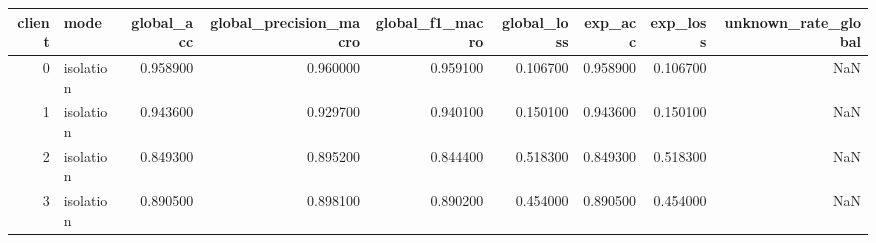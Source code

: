 \begin{tabular}{rlrrrrrrr}
\toprule
client & mode & global_acc & global_precision_macro & global_f1_macro & global_loss & exp_acc & exp_loss & unknown_rate_global \\
\midrule
0 & isolation & 0.958900 & 0.960000 & 0.959100 & 0.106700 & 0.958900 & 0.106700 & NaN \\
1 & isolation & 0.943600 & 0.929700 & 0.940100 & 0.150100 & 0.943600 & 0.150100 & NaN \\
2 & isolation & 0.849300 & 0.895200 & 0.844400 & 0.518300 & 0.849300 & 0.518300 & NaN \\
3 & isolation & 0.890500 & 0.898100 & 0.890200 & 0.454000 & 0.890500 & 0.454000 & NaN \\
\bottomrule
\end{tabular}

